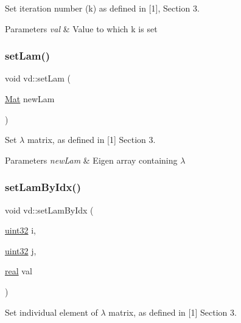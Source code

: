 Set iteration number (k) as defined in \mbox{[}1\mbox{]}, Section 3. 


\begin{DoxyParams}{Parameters}
{\em val} & Value to which k is set \\
\hline
\end{DoxyParams}
\mbox{\label{classvd_ae13e9e465d08425218bd8f85ce420c05}} 
\subsubsection{\texorpdfstring{set\+Lam()}{setLam()}}
{\footnotesize\ttfamily void vd\+::set\+Lam (\begin{DoxyParamCaption}\item[{\mbox{\hyperlink{typedefs_8h_a9fa28c1f74e909474857584f5c7b0088}{Mat}}}]{new\+Lam }\end{DoxyParamCaption})}



Set $ \lambda $ matrix, as defined in \mbox{[}1\mbox{]} Section 3. 


\begin{DoxyParams}{Parameters}
{\em new\+Lam} & Eigen array containing $ \lambda $ \\
\hline
\end{DoxyParams}
\mbox{\label{classvd_a8df228a05762e0c0a2bccc28094a1f92}} 
\subsubsection{\texorpdfstring{set\+Lam\+By\+Idx()}{setLamByIdx()}}
{\footnotesize\ttfamily void vd\+::set\+Lam\+By\+Idx (\begin{DoxyParamCaption}\item[{\mbox{\hyperlink{typedefs_8h_a8ad23e2333787a214e20a58a284a5a60}{uint32}}}]{i,  }\item[{\mbox{\hyperlink{typedefs_8h_a8ad23e2333787a214e20a58a284a5a60}{uint32}}}]{j,  }\item[{\mbox{\hyperlink{typedefs_8h_a58a0c7cf2501f4492da833421be92547}{real}}}]{val }\end{DoxyParamCaption})}



Set individual element of $\lambda$ matrix, as defined in \mbox{[}1\mbox{]} Section 3. 


